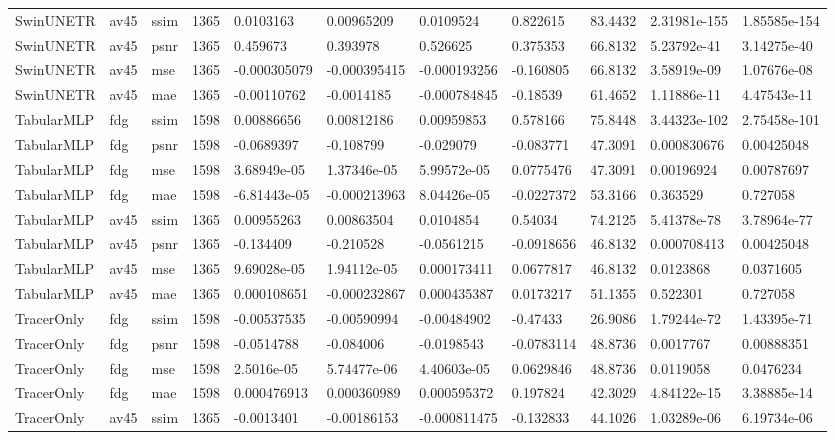 \begin{landscape}
\begin{longtable}{lllllllllll}
SwinUNETR & av45 & ssim & 1365 & 0.0103163 & 0.00965209 & 0.0109524 & 0.822615 & 83.4432 & 2.31981e-155 & 1.85585e-154 \\
SwinUNETR & av45 & psnr & 1365 & 0.459673 & 0.393978 & 0.526625 & 0.375353 & 66.8132 & 5.23792e-41 & 3.14275e-40 \\
SwinUNETR & av45 & mse & 1365 & -0.000305079 & -0.000395415 & -0.000193256 & -0.160805 & 66.8132 & 3.58919e-09 & 1.07676e-08 \\
SwinUNETR & av45 & mae & 1365 & -0.00110762 & -0.0014185 & -0.000784845 & -0.18539 & 61.4652 & 1.11886e-11 & 4.47543e-11 \\
TabularMLP & fdg & ssim & 1598 & 0.00886656 & 0.00812186 & 0.00959853 & 0.578166 & 75.8448 & 3.44323e-102 & 2.75458e-101 \\
TabularMLP & fdg & psnr & 1598 & -0.0689397 & -0.108799 & -0.029079 & -0.083771 & 47.3091 & 0.000830676 & 0.00425048 \\
TabularMLP & fdg & mse & 1598 & 3.68949e-05 & 1.37346e-05 & 5.99572e-05 & 0.0775476 & 47.3091 & 0.00196924 & 0.00787697 \\
TabularMLP & fdg & mae & 1598 & -6.81443e-05 & -0.000213963 & 8.04426e-05 & -0.0227372 & 53.3166 & 0.363529 & 0.727058 \\
TabularMLP & av45 & ssim & 1365 & 0.00955263 & 0.00863504 & 0.0104854 & 0.54034 & 74.2125 & 5.41378e-78 & 3.78964e-77 \\
TabularMLP & av45 & psnr & 1365 & -0.134409 & -0.210528 & -0.0561215 & -0.0918656 & 46.8132 & 0.000708413 & 0.00425048 \\
TabularMLP & av45 & mse & 1365 & 9.69028e-05 & 1.94112e-05 & 0.000173411 & 0.0677817 & 46.8132 & 0.0123868 & 0.0371605 \\
TabularMLP & av45 & mae & 1365 & 0.000108651 & -0.000232867 & 0.000435387 & 0.0173217 & 51.1355 & 0.522301 & 0.727058 \\
TracerOnly & fdg & ssim & 1598 & -0.00537535 & -0.00590994 & -0.00484902 & -0.47433 & 26.9086 & 1.79244e-72 & 1.43395e-71 \\
TracerOnly & fdg & psnr & 1598 & -0.0514788 & -0.084006 & -0.0198543 & -0.0783114 & 48.8736 & 0.0017767 & 0.00888351 \\
TracerOnly & fdg & mse & 1598 & 2.5016e-05 & 5.74477e-06 & 4.40603e-05 & 0.0629846 & 48.8736 & 0.0119058 & 0.0476234 \\
TracerOnly & fdg & mae & 1598 & 0.000476913 & 0.000360989 & 0.000595372 & 0.197824 & 42.3029 & 4.84122e-15 & 3.38885e-14 \\
TracerOnly & av45 & ssim & 1365 & -0.0013401 & -0.00186153 & -0.000811475 & -0.132833 & 44.1026 & 1.03289e-06 & 6.19734e-06 \\

\end{longtable}
\end{landscape}
